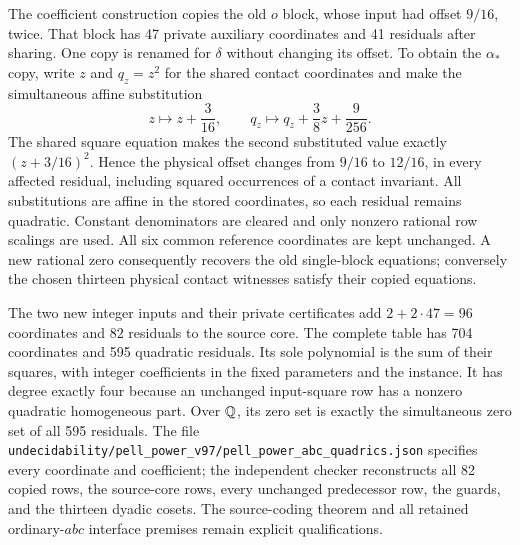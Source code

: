The coefficient construction copies the old \(o\) block, whose
input had offset \(9/16\), twice. That block has 47 private
auxiliary coordinates and 41 residuals after sharing. One copy is
renamed for \(\delta\) without changing its offset. To obtain the
\(\alpha_*\) copy, write \(z\) and \(q_z=z^2\) for the shared
contact coordinates and make the simultaneous affine substitution
\[
             z\longmapsto z+\frac3{16},\qquad
             q_z\longmapsto q_z+\frac38z+\frac9{256}.
\]
The shared square equation makes the second substituted value exactly
\((z+3/16)^2\). Hence the physical offset changes from \(9/16\)
to \(12/16\), in every affected residual, including squared
occurrences of a contact invariant. All substitutions are affine
in the stored coordinates, so each residual remains quadratic.
Constant denominators are cleared and only nonzero rational row
scalings are used. All six common reference coordinates are kept
unchanged. A new rational zero consequently recovers the old
single-block equations; conversely the chosen thirteen physical
contact witnesses satisfy their copied equations.

The two new integer inputs and their private certificates add
\(2+2\cdot47=96\) coordinates and \(82\) residuals to the source
core. The complete table has 704 coordinates and 595 quadratic
residuals. Its sole polynomial is the sum of their squares, with
integer coefficients in the fixed parameters and the instance.
It has degree exactly four because an unchanged input-square row
has a nonzero quadratic homogeneous part. Over \(\mathbb Q\), its zero
set is exactly the simultaneous zero set of all 595 residuals.
The file
\nolinkurl{undecidability/pell_power_v97/pell_power_abc_quadrics.json}
specifies every coordinate and coefficient; the independent checker
reconstructs all 82 copied rows, the source-core rows, every
unchanged predecessor row, the guards, and the thirteen dyadic
cosets. The source-coding theorem and all retained ordinary-\(abc\)
interface premises remain explicit qualifications.
